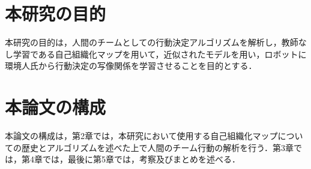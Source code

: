 \section{本研究の目的}%
本研究の目的は，人間のチームとしての行動決定アルゴリズムを解析し，教師なし学習である自己組織化マップを用いて，近似されたモデルを用い，ロボットに環境人氏から行動決定の写像関係を学習させることを目的とする．
\section{本論文の構成}%
本論文の構成は，第2章では，本研究において使用する自己組織化マップについての歴史とアルゴリズムを述べた上で人間のチーム行動の解析を行う．第3章では，第4章では，最後に第5章では，考察及びまとめを述べる．










